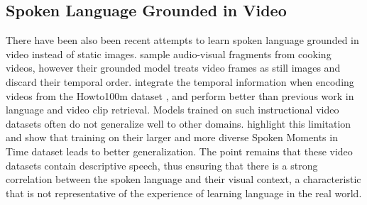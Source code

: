 \subsection{Spoken Language Grounded in Video}
\label{sec:video}
There have been also been recent attempts to learn spoken language grounded
in video instead of static images.  \citet{boggust2019grounding}
sample audio-visual fragments from cooking videos, however their
grounded model treats video frames as still images and discard their
temporal order.
\citet{rouditchenko2020avlnet} integrate the temporal information when
encoding videos from the Howto100m dataset \cite{miech2019howto100m},
and perform better than previous work in language and video clip
retrieval.
Models trained on such instructional video datasets often do not
generalize well to other domains. \citet{monfort2021spokenmoments}
highlight this limitation and show that training on their larger and
more diverse Spoken Moments in Time dataset leads to better
generalization.  The point remains that these video datasets contain
descriptive speech, thus ensuring that there is a strong correlation
between the spoken language and their visual context, a characteristic
that is not representative of the experience of learning language in
the real world.

